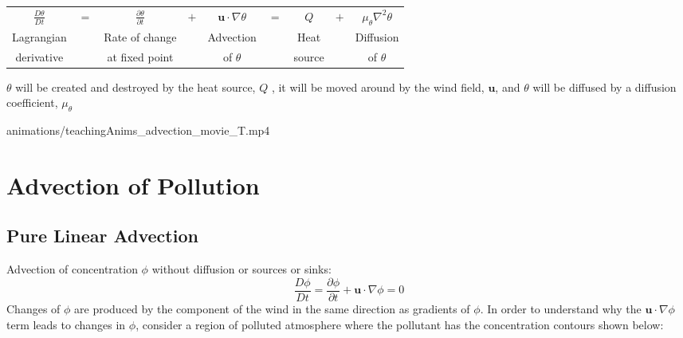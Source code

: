 \begin{center}
\begin{tabular}{ccccccccc}
$\frac{D\theta}{Dt}$ & $=$ & $\frac{\partial\theta}{\partial t}$ & $+$ & $\mathbf{u}\cdot\nabla\theta$ & $=$ & $Q$ & $+$ & $\mu_{\theta}\nabla^{2}\theta$\tabularnewline
Lagrangian &  & Rate of change &  & Advection &  & Heat &  & Diffusion\tabularnewline
derivative &  & at fixed point &  & of $\theta$ &  & source &  & of $\theta$\tabularnewline
\end{tabular}
\par\end{center}

\pause%
\begin{minipage}[c]{0.35\columnwidth}%
\begin{flushleft}
$\theta$ will be created and destroyed by the heat source, $Q$ ,
it will be moved around by the wind field, $\mathbf{u}$, and $\theta$
will be diffused by a diffusion coefficient, $\mu_{\theta}$
\par\end{flushleft}%
\end{minipage}%
\begin{minipage}[c]{0.6\columnwidth}%
{animations/teachingAnims_advection_movie_T.mp4}%
\end{minipage}


\section{Advection of Pollution\label{sec:Advection-of-Pollution}}


\subsection{Pure Linear Advection}

Advection of concentration $\phi$ without diffusion or sources or
sinks:
\begin{equation}
\frac{D\phi}{Dt}=\frac{\partial\phi}{\partial t}+\mathbf{u}\cdot\nabla\phi=0\label{eqn:3dAdvect}
\end{equation}
Changes of $\phi$ are produced by the component of the wind in the
same direction as gradients of $\phi$. In order to understand why
the $\mathbf{u}\cdot\nabla\phi$ term leads to changes in $\phi$,
consider a region of polluted atmosphere where the pollutant has the
concentration contours shown below:

